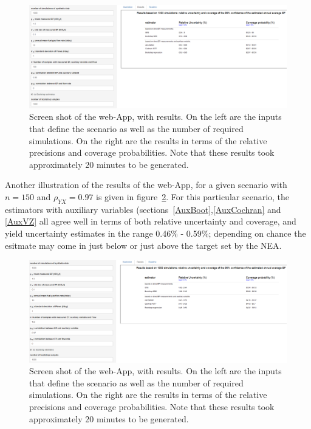 \begin{figure}[h]
	\centering
	\includegraphics[width=\textwidth]{graphs/ResultsCapture.PNG}
	\caption{Screen shot of the web-App, with results. On the left are the inputs that define the scenario as well as the number of required simulations. On the right are the results in terms of the relative precisions and coverage probabilities. Note that these results took approximately 20 minutes to be generated. }
	\label{fig:AppResults}
\end{figure}


Another illustration of the results of the web-App, for a given scenario with $n=150$ and $\rho_{YX}=0.97$ is given in figure~\ref{fig:AppResults2}. For this particular scenario, the estimators with auxiliary variables (sections~\ref{AuxBoot},\ref{AuxCochran} and \ref{AuxVZ} all agree well in terms of both relative uncertainty and coverage, and yield uncertainty estimates in the range 0.46\% - 0.59\%; depending on chance the esitmate may come in just below or just above the target set by the NEA. 
\begin{figure}[h]
	\centering
	\includegraphics[width=\textwidth]{graphs/ResultsCapture2.PNG}
	\caption{Screen shot of the web-App, with results. On the left are the inputs that define the scenario as well as the number of required simulations. On the right are the results in terms of the relative precisions and coverage probabilities. Note that these results took approximately 20 minutes to be generated. }
	\label{fig:AppResults2}
\end{figure}

